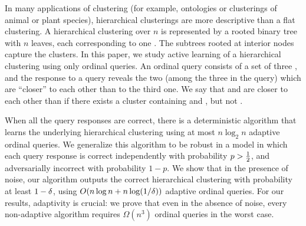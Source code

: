 
In many applications of clustering
(for example, ontologies or clusterings of animal or plant species),
hierarchical clusterings are more descriptive
than a flat clustering.
A hierarchical clustering over $n$ \elements
is represented by a rooted binary tree
with $n$ leaves, each corresponding to one \element.
The subtrees rooted at interior nodes capture the clusters.
In this paper, we study active learning
of a hierarchical clustering using only ordinal queries.
An ordinal query consists of a set of three \elements,
and the response to a query reveals the two \elements
(among the three \elements in the query)
which are ``closer'' to each other than to the third one.
We say that \elements \ElS and \ElSP
are closer to each other than \ElSPP
if there exists a cluster containing \ElS and \ElSP,
but not \ElSPP.

When all the query responses are correct,
there is a deterministic algorithm that 
learns the underlying hierarchical clustering
using at most $n \log_2 n$ adaptive ordinal queries.
We generalize this algorithm to be robust in a model in which
each query response is correct independently with probability $p > \Half$,
and adversarially incorrect with probability $1 - p$.
We show that in the presence of noise,
our algorithm outputs the correct hierarchical clustering
with probability at least $1 - \delta$,
using $O(n \log n + n \log(1/\delta))$ adaptive ordinal queries.
For our results, adaptivity is crucial:
we prove that even in the absence of noise,
every non-adaptive algorithm requires $\Omega(n^3)$ ordinal queries
in the worst case.
